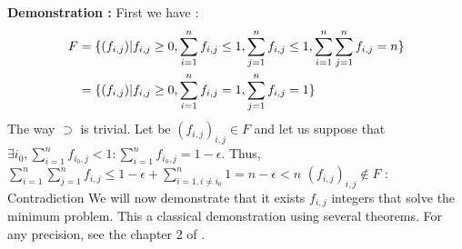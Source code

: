 \documentclass{article}
\begin{document}
	\textbf{Demonstration :}\newline
	\newline
	First we have :
	\begin{multline*}
	\begin{split}
	F	&= \{(f_{i,j})| f_{i,j}\geq 0,\sum\limits_{i=1}^n f_{i,j} \leq 1, \sum\limits_{j=1}^n f_{i,j} \leq 1, \sum\limits_{i=1}^n \sum\limits_{j=1}^n f_{i,j} = n\} \newline \\
		&= \{(f_{i,j})| f_{i,j}\geq 0,\sum\limits_{i=1}^n f_{i,j} = 1, \sum\limits_{j=1}^n f_{i,j} = 1 \}
	\end{split}
	\end{multline*}
	The way $\supset$ is trivial.\newline
	\newline
	Let be $(f_{i,j})_{i,j} \in F$ and let us suppose that $\exists i_0, \sum\limits_{i=1}^n f_{i_0,j} < 1 : \sum\limits_{i=1}^n f_{i_0,j} = 1-\epsilon $.\newline
	Thus, $\sum\limits_{i=1}^n \sum\limits_{j=1}^n f_{i,j} \leq 1-\epsilon +\sum\limits_{i=1,i\neq i_0}^n 1= n-\epsilon < n $\newline
	$(f_{i,j})_{i,j} \notin F$ : Contradiction \newline
	\newline
	We will now demonstrate that it exists $f_{i,j}$ integers that solve the minimum problem. This a classical demonstration using several theorems. For any precision, see the chapter 2 of \cite{gaubert}.\newline
	
\end{document}
